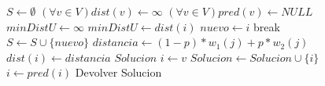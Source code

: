\begin{center}
 \begin{figure}[H]
  \begin{pseudo}
    \State $S \leftarrow \emptyset$
    \State $(\forall v \in V) dist(v) \leftarrow \infty$
    \State $(\forall v \in V) pred(v) \leftarrow NULL$
    \State $minDistU \leftarrow \infty$
	\State $minDistU \leftarrow dist(i)$
	\State $nuevo \leftarrow i$
      \EndIf
    \EndFor
      \State break
    \EndIf
    \State $S \leftarrow S \cup \{nuevo\}$
      \State $distancia \leftarrow (1-p)*w_1(j) + p*w_2(j)$
	\State $dist(i) \leftarrow distancia$
      \EndIf
    \EndFor
    \EndWhile
    \State $Solucion$
    \State $i \leftarrow v$
      \State $Solucion \leftarrow Solucion \cup \{i\}$
      \State $i \leftarrow pred(i)$
    \EndWhile
    \State Devolver Solucion
    \EndProcedure
  \end{pseudo}
 \end{figure}
\end{center}